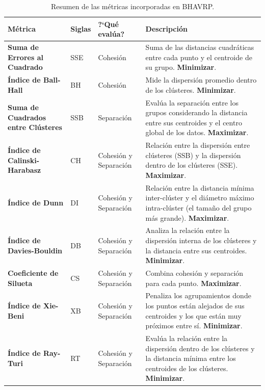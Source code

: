 \begin{table}[H]
\centering
\caption{Resumen de las m\'etricas incorporadas en BHAVRP.}
\label{tab:metricas}
\small
\begin{tabular}{@{}lp{1.3cm}p{2cm}p{8.5cm}@{}}
\toprule
\textbf{M\'etrica} & \textbf{Siglas} & \textbf{?`Qu\'e eval\'ua?} & \textbf{Descripci\'on} \\
\midrule
\textbf{Suma de Errores al Cuadrado} & SSE & Cohesi\'on & Suma de las distancias cuadr\'aticas entre cada punto y el centroide de su grupo. \textbf{Minimizar}. \\
\textbf{\'Indice de Ball-Hall} & BH & Cohesi\'on & Mide la dispersi\'on promedio dentro de los cl\'usteres. \textbf{Minimizar}. \\
\textbf{Suma de Cuadrados entre Cl\'usteres} & SSB & Separaci\'on & Eval\'ua la separaci\'on entre los grupos considerando la distancia entre sus centroides y el centro global de los datos. \textbf{Maximizar}. \\
\textbf{\'Indice de Calinski-Harabasz} & CH & Cohesi\'on y Separaci\'on & Relaci\'on entre la dispersi\'on entre cl\'usteres (SSB) y la dispersi\'on dentro de los cl\'usteres (SSE). \textbf{Maximizar}. \\
\textbf{\'Indice de Dunn} & DI & Cohesi\'on y Separaci\'on & Relaci\'on entre la distancia m\'inima inter-cl\'uster y el di\'ametro m\'aximo intra-cl\'uster (el tama\~no del grupo m\'as grande). \textbf{Maximizar}. \\
\textbf{\'Indice de Davies-Bouldin} & DB & Cohesi\'on y Separaci\'on & Analiza la relaci\'on entre la dispersi\'on interna de los cl\'usteres y la distancia entre sus centroides. \textbf{Minimizar}. \\
\textbf{Coeficiente de Silueta} & CS & Cohesi\'on y Separaci\'on & Combina cohesi\'on y separaci\'on para cada punto. \textbf{Maximizar}. \\
\textbf{\'Indice de Xie-Beni} & XB & Cohesi\'on y Separaci\'on & Penaliza los agrupamientos donde los puntos est\'an alejados de sus centroides y los que est\'an muy pr\'oximos entre s\'i. \textbf{Minimizar}. \\
\textbf{\'Indice de Ray-Turi} & RT & Cohesi\'on y Separaci\'on & Eval\'ua la relaci\'on entre la dispersi\'on dentro de los cl\'usteres y la distancia m\'inima entre los centroides de los cl\'usteres. \textbf{Minimizar}. \\
\bottomrule
\end{tabular}
\end{table}

